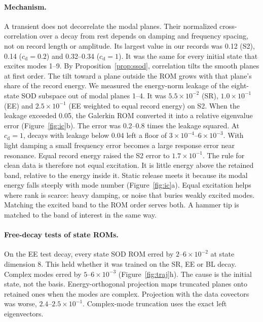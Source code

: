 \documentclass[preprint,12pt]{elsarticle}
\begin{document}
\paragraph{Mechanism.} A transient does not decorrelate the modal planes. Their normalized cross-correlation over a decay from rest depends on damping and frequency spacing, not on record length or amplitude. Its largest value in our records was 0.12 (S2), 0.14 ($c_{\mathrm d}=0.2$) and 0.32--0.34 ($c_{\mathrm d}=1$). It was the same for every initial state that excites modes 1--9.
By Proposition~\ref{prop:ssod}, correlation tilts the smooth planes at first order. The tilt toward a plane outside the ROM grows with that plane's share of the record energy.
We measured the energy-norm leakage of the eight-state SOD subspace out of modal planes 1--4. It was $5.5\times10^{-2}$ (SR), $1.0\times10^{-1}$ (EE) and $2.5\times10^{-1}$ (EE weighted to equal record energy) on S2.
When the leakage exceeded 0.05, the Galerkin ROM converted it into a relative eigenvalue error (Figure~\ref{fig:ic}b). The error was 0.2--0.8 times the leakage squared. At $c_{\mathrm d}=1$, decays with leakage below 0.04 left a floor of $3\times10^{-4}$--$6\times10^{-3}$. With light damping a small frequency error becomes a large response error near resonance. Equal record energy raised the S2 error to $1.7\times10^{-1}$.
The rule for clean data is therefore not equal excitation. It is little energy above the retained band, relative to the energy inside it. Static release meets it because its modal energy falls steeply with mode number (Figure~\ref{fig:ic}a).
Equal excitation helps where rank is scarce: heavy damping, or noise that buries weakly excited modes. Matching the excited band to the ROM order serves both. A hammer tip is matched to the band of interest in the same way.

\paragraph{Free-decay tests of state ROMs.} On the EE test decay, every state SOD ROM erred by $2$--$6\times10^{-2}$ at state dimension 8. This held whether it was trained on the SR, EE or BL decay. Complex modes erred by $5$--$6\times10^{-3}$ (Figure~\ref{fig:traj}h). The cause is the initial state, not the basis. Energy-orthogonal projection maps truncated planes onto retained ones when the modes are complex. Projection with the data covectors was worse, $2.4$--$2.5\times10^{-1}$. Complex-mode truncation uses the exact left eigenvectors.
\end{document}

